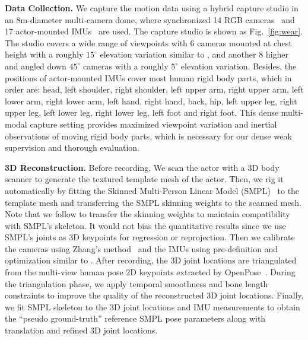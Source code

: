 \documentclass[letterpaper]{article} \usepackage{aaai23}  \usepackage{times}  \usepackage{helvet}  \usepackage{courier}  \usepackage[hyphens]{url}  \usepackage{graphicx} \urlstyle{rm} \def\UrlFont{\rm}  \usepackage{natbib}  \usepackage{caption} \frenchspacing  \setlength{\pdfpagewidth}{8.5in}  \setlength{\pdfpageheight}{11in}  \usepackage{algorithm}
\newcommand{\myparagraph}[1]{\vspace{0.1em}\noindent\textbf{#1}}
\begin{document}
\myparagraph{Data Collection.}
We capture the motion data using a hybrid capture studio in an 8m-diameter multi-camera dome, where synchronized 14 RGB cameras~\cite{Z-CAM} and 17 actor-mounted IMUs~\cite{NOITOM} are used. 
The capture studio is shown as Fig.~\ref{fig:wear}. The studio covers a wide range of viewpoints with 6 cameras mounted at chest height with a roughly $15^{\circ}$ elevation variation similar to \cite{mehta2017monocular}, and another 8 higher and angled down $45^{\circ}$ cameras with a roughly $5^{\circ}$ elevation variation.
Besides, the positions of actor-mounted IMUs cover most human rigid body parts, which in order are: head, left shoulder, right shoulder, left upper arm, right upper arm, left lower arm, right lower arm, left hand, right hand, back, hip, left upper leg, right upper leg, left lower leg, right lower leg, left foot and right foot. 
This dense multi-modal capture setting provides maximized viewpoint variation and inertial observations of moving rigid body parts, which is necessary for our dense weak supervision and thorough evaluation.


\myparagraph{3D Reconstruction.}
Before recording, We scan the actor with a 3D body scanner to generate the textured template mesh of the actor. Then, we rig it automatically by fitting the Skinned Multi-Person Linear Model (SMPL)~\cite{SMPL2015} to the template mesh and transferring the SMPL skinning weights to the scanned mesh.
Note that we follow \cite{EventCap_CVPR2020, challencap} to transfer the skinning weights to maintain compatibility with SMPL's skeleton. It would not bias the quantitative results since we use SMPL's joints as 3D keypoints for regression or reprojection. 
Then we calibrate the cameras using Zhang's method~\cite{zhang2000flexible} and the IMUs using pre-definition and optimization similar to \cite{HybridFusion}.
After recording, the 3D joint locations are triangulated from the multi-view human pose 2D keypoints extracted by OpenPose~\cite{OpenPose}. 
During the triangulation phase, we apply temporal smoothness and bone length constraints to improve the quality of the reconstructed 3D joint locations.
Finally, we fit SMPL skeleton to the 3D joint locations and IMU measurements to obtain the ``pseudo ground-truth'' reference SMPL pose parameters along with translation and refined 3D joint locations.
\end{document}
